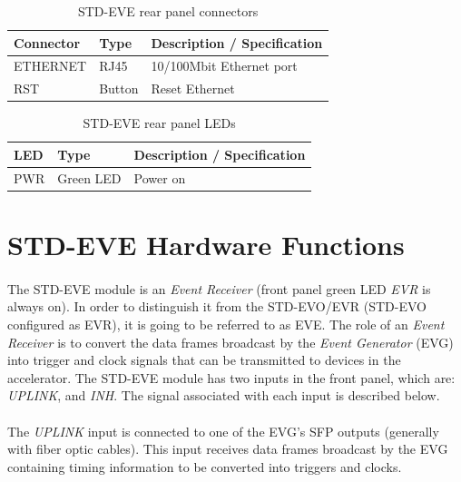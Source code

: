 \documentclass[openany]{article}
\begin{document}
	\begin{table}[!h]
	  \centering
	  \caption{STD-EVE rear panel connectors}
	  \label{tab:rear-panel-connectors}
	  \begin{tabular}{| m{3.5cm} m{4.0cm} m{7.0cm} |}
	    \hline
	    \bfseries Connector & \bfseries Type & \bfseries Description / Specification \\ \hline
	    ETHERNET & RJ45 & 10/100Mbit Ethernet port \\ \hline
	    RST & Button & Reset Ethernet \\ \hline
	  \end{tabular}
	\end{table}

	\begin{table}[!h]
	  \centering
	  \caption{STD-EVE rear panel LEDs}
	  \label{tab:rear-panel-leds}
	  \begin{tabular}{| m{3.5cm} m{4.0cm} m{7.0cm} |}
	    \hline
	    \bfseries LED & \bfseries Type & \bfseries Description / Specification \\ \hline
	    PWR & Green LED & Power on \\ \hline
	  \end{tabular}
	\end{table}

\FloatBarrier
\section{STD-EVE Hardware Functions}

		\paragraph{} The STD-EVE module is an \emph{Event Receiver} (front panel green LED \emph{EVR} is always on). In order to distinguish it from the STD-EVO/EVR (STD-EVO configured as EVR), it is going to be referred to as EVE. The role of an \emph{Event Receiver} is to convert the data frames broadcast by the \emph{Event Generator} (EVG) into trigger and clock signals that can be transmitted to devices in the accelerator. The STD-EVE module has two inputs in the front panel, which are: \emph{UPLINK}, and \emph{INH}. The signal associated with each input is described below.

		\paragraph{} The \emph{UPLINK} input is connected to one of the EVG's SFP outputs (generally with fiber optic cables). This input receives data frames broadcast by the EVG containing timing information to be converted into triggers and clocks.
\end{document}
